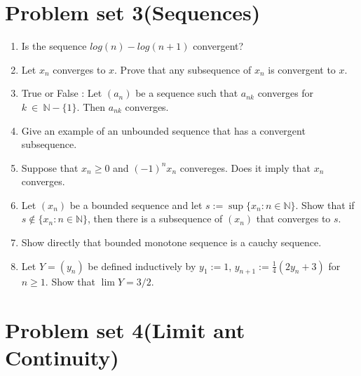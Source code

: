 \documentclass[12pt]{article}
\begin{document}
\newpage

\section{Problem set 3(Sequences)}
    \begin{enumerate}
        \item Is the sequence $ log (n) - log(n+1) $ convergent?
        \item Let $x_n $ converges to $x$. Prove that any subsequence of $x_n $ is convergent to $x$.
        \item True or False :
        Let $(a_n)$ be a sequence such that $a_{nk}$ converges for $k~\in~ \mathbb N - \{1\}$. Then $a_{nk}$ converges. 
        \item Give an example of an unbounded sequence that has a convergent subsequence.
        \item Suppose that $x_n\geq0$ and $(-1)^nx_n$ convereges. Does it imply that $x_n$ converges.
        \item Let $(x_n)$ be a bounded sequence and let $s := \sup\{x_n : n \in \mathbb{N}\}$. Show that if $s \notin \{x_n : n \in \mathbb{N}\}$, then there is a subsequence of $(x_n)$ that converges to $s$.
        \item Show directly that bounded monotone sequence is a cauchy sequence.
        \item Let $Y = (y_n)$ be defined inductively by $y_1 := 1$, $y_{n+1} := \frac{1}{4}(2y_n+3)$ for $n \ge 1$. Show that $\lim Y = 3/2$.
    \end{enumerate}

\newpage

\section{Problem set 4(Limit ant Continuity)}
\end{document}
